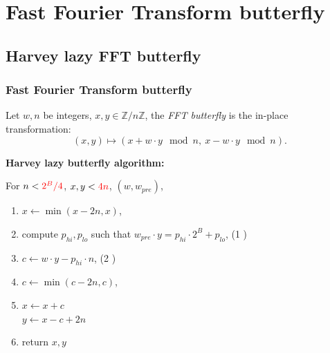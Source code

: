 \documentclass[10pt]{beamer}
\begin{document}
\section{Fast Fourier Transform butterfly}
\subsection{Harvey lazy FFT butterfly}
\begin{frame}
    \frametitle{Fast Fourier Transform butterfly}
    \begin{mybox}
    Let $w, n$ be integers, $x,y \in \mathbb{Z}/n\mathbb{Z}$, 
    the \textit{FFT butterfly}\cite{Cooley_Tukey_1965} is the in-place transformation: 
    \[
    (x,y) \mapsto (x + w\cdot y \mod n,\ x - w\cdot y \mod n).
    \]
    \end{mybox}
    
    \pause
    \bigskip
    \textbf{Harvey lazy butterfly algorithm\cite{DBLP:journals/corr/abs-1205-2926}:}

    
    \medskip
    For $n < \textcolor{red}{2^B /4}$, $x,y < \textcolor{red}{4n}$, $(w, w_{pre})$,
    \begin{enumerate}
        \item $x \gets \min(x-2n, x)$,
        \item compute $p_{hi}, p_{lo}$ such that $w_{pre} \cdot y = p_{hi}\cdot 2^B + p_{lo}$, \hfill (1 )
        \item $c \gets w\cdot y - p_{hi}\cdot n$, \hfill (2 )
        \item $c \gets \min(c-2n, c)$,
        \item $x\gets x + c$ \\
            $y \gets x - c + 2n$
        \item return $x,y$
    \end{enumerate}
\end{frame}
\end{document}
